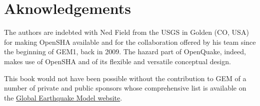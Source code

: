 \chapter*{Aknowledgements}
The authors are indebted with Ned Field from the USGS in Golden (CO, USA)
for making OpenSHA available and for the collaboration offered by his
team since the beginning of GEM1, back in 2009. 
%
The hazard part of OpenQuake, indeed, makes use of OpenSHA and of its 
flexible and versatile conceptual design.

This book would not have been possible without the contribution to 
GEM of a number of private and public sponsors whose comprehensive 
list is available on the 
\href{http://globalquakemodel.org}{Global Earthquake Model website}.

